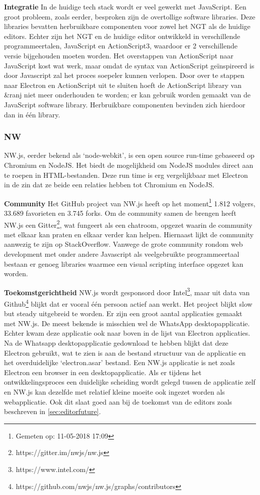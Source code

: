 \textbf{Integratie}
In de huidige tech stack wordt er veel gewerkt met JavaScript. Een groot probleem, zoals eerder, besproken zijn de overtollige software libraries. Deze libraries bevatten herbruikbare componenten voor zowel het NGT als de huidige editors. Echter zijn het NGT en de huidige editor ontwikkeld in verschillende programmeertalen, JavaScript en ActionScript3, waardoor er 2 verschillende versie bijgehouden moeten worden. Het overstappen van ActionScript naar JavaScript kost wat werk, maar omdat de syntax van ActionScript geïnspireerd is door Javascript zal het proces soepeler kunnen verlopen.
Door over te stappen naar Electron en ActionScript uit te sluiten hoeft de ActionScript library van \&ranj niet meer onderhouden te worden; er kan gebruik worden gemaakt van de JavaScript software library. Herbruikbare componenten bevinden zich hierdoor dan in één library.

\pagebreak
\subsubsection{NW}
NW.js, eerder bekend als ‘node-webkit’, is een open source run-time gebaseerd op Chromium en NodeJS. Het biedt de mogelijkheid om NodeJS modules direct aan te roepen in HTML-bestanden. Deze run time is erg vergelijkbaar met Electron in de zin dat ze beide een relaties hebben tot Chromium en NodeJS.

\textbf{Community}
Het GitHub project van NW.js heeft op het moment\footnote{Gemeten op: 11-05-2018 17:09} 1.812 volgers, 33.689 favorieten en 3.745 forks\cite{NWGitHub}. Om de community samen de brengen heeft NW.js een Gitter\footnote{https://gitter.im/nwjs/nw.js}, wat fungeert als een chatroom, opgezet waarin de community met elkaar kan praten en elkaar verder kan helpen. Hiernaast lijkt de community aanwezig te zijn op StackOverflow\cite{StackOverflowNW}.
Vanwege de grote community rondom web development met onder andere Javascript als veelgebruikte programmeertaal bestaan er genoeg libraries waarmee een visual scripting interface opgezet kan worden.

\textbf{Toekomstgerichtheid}
NW.js wordt gesponsord door Intel\footnote{https://www.intel.com/}, maar uit data van Github\footnote{https://github.com/nwjs/nw.js/graphs/contributors} blijkt dat er vooral één persoon actief aan werkt. Het project blijkt slow but steady uitgebreid te worden.
Er zijn een groot aantal applicaties gemaakt met NW.js\cite{NWJSApps}. De meest bekende is misschien wel de WhatsApp desktopapplicatie. Echter kwam deze applicatie ook naar boven in de lijst van Electron applicaties. Na de Whatsapp desktopapplicatie gedownload te hebben blijkt dat deze Electron gebruikt, wat te zien is aan de bestand structuur van de applicatie en het overduidelijke ‘electron.asar’ bestand.
Een NW.js applicatie is net zoals Electron een browser in een desktopapplicatie. Als er tijdens het ontwikkelingsproces een duidelijke scheiding wordt gelegd tussen de applicatie zelf en NW.js kan dezelfde met relatief kleine moeite ook ingezet worden als webapplicatie. Ook dit slaat goed aan bij de toekomst van de editors zoals beschreven in \autoref{sec:editorfuture}.

